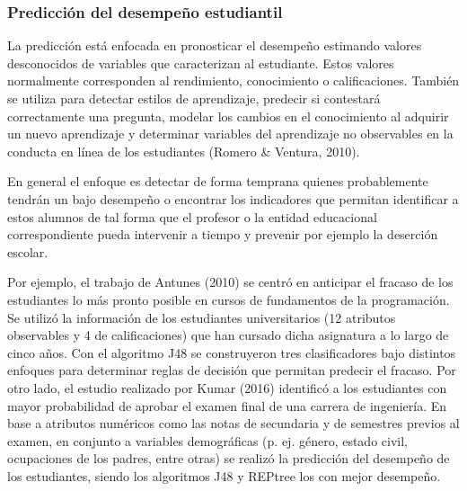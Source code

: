 



\subsubsection*{Predicción del desempeño estudiantil}
La predicción está enfocada en pronosticar el desempeño estimando valores desconocidos de variables que caracterizan al estudiante. Estos valores normalmente corresponden al rendimiento, conocimiento o calificaciones. También se utiliza para detectar estilos de aprendizaje, predecir si contestará correctamente una pregunta, modelar los cambios en el conocimiento al adquirir un nuevo aprendizaje y determinar variables del aprendizaje no observables en la conducta en línea de los estudiantes (Romero & Ventura, 2010). 

En general el enfoque es detectar de forma temprana quienes probablemente tendrán un bajo desempeño o encontrar los indicadores que permitan identificar a estos alumnos de tal forma que el profesor o la entidad educacional correspondiente pueda intervenir a tiempo y prevenir por ejemplo la deserción escolar. 

Por ejemplo, el trabajo de Antunes (2010) se centró en anticipar el fracaso de los estudiantes lo más pronto posible en cursos de fundamentos de la programación. Se utilizó la información de los estudiantes universitarios (12 atributos observables y 4 de calificaciones) que han cursado dicha asignatura a lo largo de cinco años. Con el algoritmo J48 se construyeron tres clasificadores bajo distintos enfoques para determinar reglas de decisión que permitan predecir el fracaso. Por otro lado, el estudio realizado por Kumar (2016) identificó a los estudiantes con mayor probabilidad de aprobar el examen final de una carrera de ingeniería. En base a atributos numéricos como las notas de secundaria y de semestres previos al examen, en conjunto a variables demográficas (p. ej. género, estado civil, ocupaciones de los padres, entre otras) se realizó la predicción del desempeño de los estudiantes, siendo los algoritmos J48 y REPtree los con mejor desempeño.


